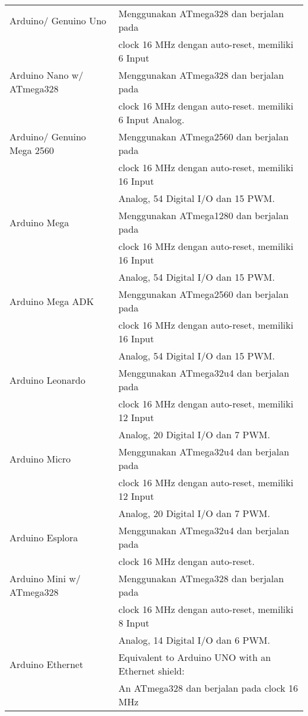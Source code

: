 \begin{table}[!ht]
\centering
\begin{tabular}{ |l|l| }
\hline
Arduino/ Genuino Uno & Menggunakan ATmega328 dan berjalan pada \\
& clock 16 MHz dengan auto-reset, memiliki 6 Input \\
\hline
Arduino Nano w/ ATmega328 & Menggunakan ATmega328 dan berjalan pada \\
& clock 16 MHz dengan auto-reset. memiliki 6 Input Analog.\\
\hline
Arduino/ Genuino Mega 2560 & Menggunakan ATmega2560 dan berjalan pada \\
& clock 16 MHz dengan auto-reset, memiliki 16 Input \\
& Analog, 54 Digital I/O dan 15 PWM. \\
\hline
Arduino Mega & Menggunakan ATmega1280 dan berjalan pada \\
& clock 16 MHz dengan auto-reset, memiliki 16 Input \\
& Analog, 54 Digital I/O dan 15 PWM.\\
\hline
Arduino Mega ADK & Menggunakan ATmega2560 dan berjalan pada \\
& clock 16 MHz dengan auto-reset, memiliki 16 Input \\
& Analog, 54 Digital I/O dan 15 PWM. \\
\hline
Arduino Leonardo & Menggunakan ATmega32u4 dan berjalan pada \\
& clock 16 MHz dengan auto-reset, memiliki 12 Input \\
& Analog, 20 Digital I/O dan 7 PWM.\\
\hline
Arduino Micro & Menggunakan ATmega32u4 dan berjalan pada \\
& clock 16 MHz dengan auto-reset, memiliki 12 Input \\
& Analog, 20 Digital I/O dan 7 PWM. \\
\hline
Arduino Esplora & Menggunakan ATmega32u4 dan berjalan pada \\
& clock 16 MHz dengan auto-reset.\\
\hline
Arduino Mini w/ ATmega328 & Menggunakan ATmega328 dan berjalan pada \\
& clock 16 MHz dengan auto-reset, memiliki 8 Input \\
& Analog, 14 Digital I/O dan 6 PWM.\\
\hline
Arduino Ethernet & Equivalent to Arduino UNO with an Ethernet shield: \\
& An ATmega328 dan berjalan pada clock 16 MHz \\ 

\end{tabular}
\end{table}
